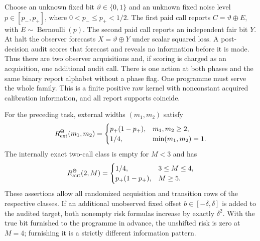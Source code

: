 Choose an unknown fixed bit $\vartheta\in\{0,1\}$ and an unknown fixed noise level $p\in[p_-,p_+]$, where $0<p_-\le p_+<1/2$. The first paid call reports
$C=\vartheta\oplus E$, with $E\sim\operatorname{Bernoulli}(p)$. The second paid call reports an independent fair bit $Y$. At halt the observer forecasts $X=\vartheta\oplus Y$ under scalar squared loss. A post-decision audit scores that forecast and reveals no information before it is made. Thus there are two observer acquisitions and, if scoring is charged as an acquisition, one additional audit call. There is one action at both phases and the same binary report alphabet without a phase flag. One programme must serve the whole family. This is a finite positive raw kernel with nonconstant acquired calibration information, and all report supports coincide.

\begin{proposition}\label{prop:uniform_threshold}
For the preceding task, external widths $(m_1,m_2)$ satisfy
\begin{equation}\label{eq:threshold_external}
 R^\Theta_{\mathrm{ext}}(m_1,m_2)=
 \begin{cases}
 p_+(1-p_+),&m_1,m_2\ge2,\\
 1/4,&\min(m_1,m_2)=1.
 \end{cases}
\end{equation}
The internally exact two-call class is empty for $M<3$ and has
\begin{equation}\label{eq:threshold_aut}
 R^\Theta_{\mathrm{aut}}(2,M)=
 \begin{cases}1/4,&3\le M\le4,\\ p_+(1-p_+),&M\ge5.\end{cases}
\end{equation}
These assertions allow all randomized acquisition and transition rows of the respective classes. If an additional unobserved fixed offset $b\in[-\delta,\delta]$ is added to the audited target, both nonempty risk formulas increase by exactly $\delta^2$. With the true bit furnished to the programme in advance, the unshifted risk is zero at $M=4$; furnishing it is a strictly different information pattern.
\end{proposition}
